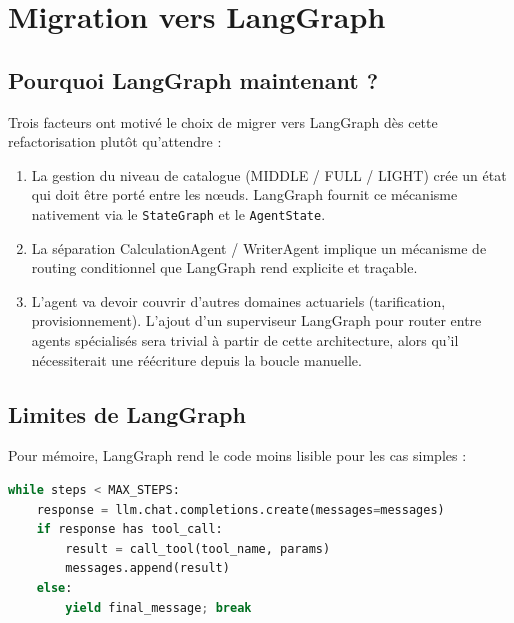 \documentclass[12pt, a4paper]{article}
\begin{document}
\section{Migration vers LangGraph}

\subsection{Pourquoi LangGraph maintenant ?}

Trois facteurs ont motivé le choix de migrer vers LangGraph dès cette
refactorisation plutôt qu'attendre :

\begin{enumerate}
  \item La gestion du niveau de catalogue (MIDDLE / FULL / LIGHT) crée un
    état qui doit être porté entre les nœuds. LangGraph fournit ce mécanisme
    nativement via le \texttt{StateGraph} et le \texttt{AgentState}.

  \item La séparation CalculationAgent / WriterAgent implique un mécanisme
    de routing conditionnel que LangGraph rend explicite et traçable.

  \item L'agent va devoir couvrir d'autres domaines actuariels (tarification,
    provisionnement). L'ajout d'un superviseur LangGraph pour router entre
    agents spécialisés sera trivial à partir de cette architecture, alors qu'il
    nécessiterait une réécriture depuis la boucle manuelle.
\end{enumerate}

\subsection{Limites de LangGraph}

Pour mémoire, LangGraph rend le code moins lisible pour les cas simples :

\begin{lstlisting}[language=Python, caption={Boucle manuelle (ancienne approche) — très lisible}]
while steps < MAX_STEPS:
    response = llm.chat.completions.create(messages=messages)
    if response has tool_call:
        result = call_tool(tool_name, params)
        messages.append(result)
    else:
        yield final_message; break
\end{lstlisting}
\end{document}
